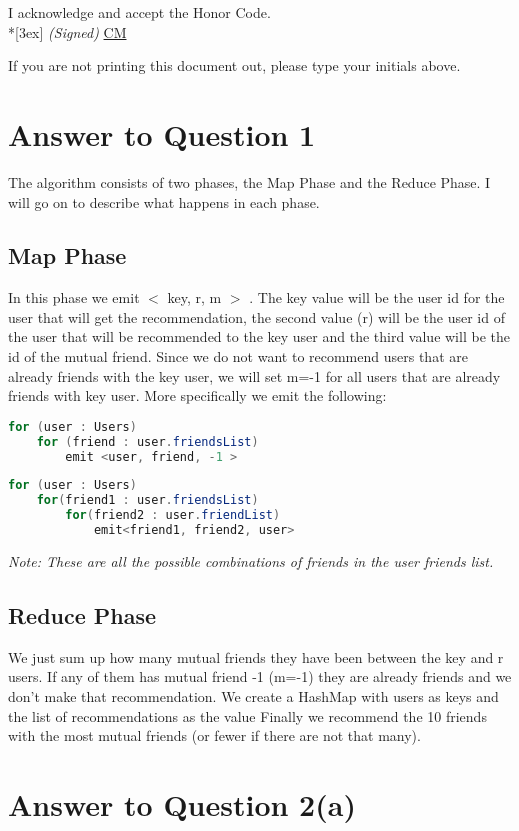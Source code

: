 \documentclass[11pt]{article}
\begin{document}
\vfill

I acknowledge and accept the Honor Code.\\*[3ex]
\bigskip
\textit{(Signed)} \underline{CM} 

If you are not printing this document out, please type your initials above.

\vfill
\vfill

\pagebreak[4]
\section*{Answer to Question 1}
The algorithm consists of two phases, the Map Phase and the Reduce Phase. I will go on to describe what happens in each phase.

\subsection*{Map Phase}
In this phase we emit $<$ key, r, m $>$ . The key value will be the user id for the user that will get the recommendation, the second value (r) will be the user id of the user that will be recommended to the key user and the third value will be the id of the mutual friend. Since we do not want to recommend users that are already friends with the key user, we will set m=-1 for all users that are already friends with key user. 
More specifically we emit the following:
\begin{lstlisting}[language=Java]
for (user : Users)
	for (friend : user.friendsList)
		emit <user, friend, -1 >
\end{lstlisting}
\begin{lstlisting}[language=Java]
for (user : Users)
	for(friend1 : user.friendsList)
		for(friend2 : user.friendList)
			emit<friend1, friend2, user>
\end{lstlisting}
\textit{Note: These are all the possible combinations of friends in the user friends list.}

\subsection*{Reduce Phase} 
We just sum up how many mutual friends they have been between the key and r users. If any of them has mutual friend -1 (m=-1) they are already friends and we don't make that recommendation. 
We create a HashMap with users as keys and the list of recommendations as the value
Finally we recommend the 10 friends with the most mutual friends (or fewer if there are not that many). 
\pagebreak[4]
\section*{Answer to Question 2(a)}
\end{document}
